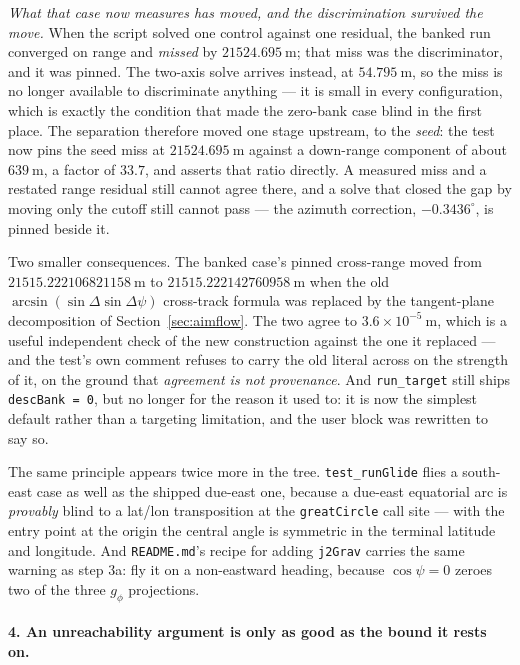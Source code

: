 \documentclass[11pt]{article}
\newcommand{\code}[1]{\texttt{#1}}
\begin{document}
\emph{What that case now measures has moved, and the discrimination survived
the move.} When the script solved one control against one residual, the banked
run converged on range and \emph{missed} by $21524.695~\mathrm{m}$; that miss
was the discriminator, and it was pinned. The two-axis solve arrives instead,
at $54.795~\mathrm{m}$, so the miss is no longer available to discriminate
anything --- it is small in every configuration, which is exactly the
condition that made the zero-bank case blind in the first place. The
separation therefore moved one stage upstream, to the \emph{seed}: the test
now pins the seed miss at $21524.695~\mathrm{m}$ against a down-range
component of about $639~\mathrm{m}$, a factor of $33.7$, and asserts that
ratio directly. A measured miss and a restated range residual still cannot
agree there, and a solve that closed the gap by moving only the cutoff still
cannot pass --- the azimuth correction, $-0.3436^\circ$, is pinned beside it.

Two smaller consequences. The banked case's pinned cross-range moved from
$21515.222106821158~\mathrm{m}$ to $21515.222142760958~\mathrm{m}$ when the
old $\arcsin(\sin\Delta\sin\Delta\psi)$ cross-track formula was replaced by
the tangent-plane decomposition of Section~\ref{sec:aimflow}. The two agree to
$3.6\times10^{-5}~\mathrm{m}$, which is a useful independent check of the new
construction against the one it replaced --- and the test's own comment refuses
to carry the old literal across on the strength of it, on the ground that
\emph{agreement is not provenance}. And \code{run\_target} still ships
\code{descBank = 0}, but no longer for the reason it used to: it is now the
simplest default rather than a targeting limitation, and the user block was
rewritten to say so.

The same principle appears twice more in the tree. \code{test\_runGlide} flies
a south-east case as well as the shipped due-east one, because a due-east
equatorial arc is \emph{provably} blind to a lat/lon transposition at the
\code{greatCircle} call site --- with the entry point at the origin the central
angle is symmetric in the terminal latitude and longitude. And
\code{README.md}'s recipe for adding \code{j2Grav} carries the same warning as
step 3a: fly it on a non-eastward heading, because $\cos\psi = 0$ zeroes two of
the three $g_\phi$ projections.

\paragraph{4. An unreachability argument is only as good as the bound it rests
on.}
\end{document}
